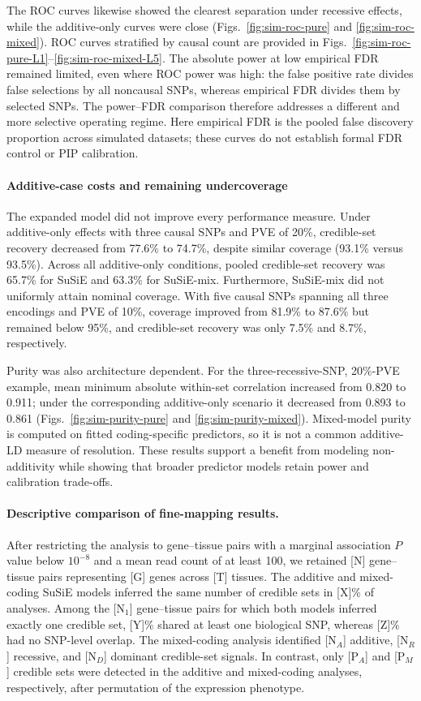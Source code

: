 \documentclass[12pt]{article}
\begin{document}
The ROC curves likewise showed the clearest separation under recessive
effects, while the additive-only curves were close
(Figs.~\ref{fig:sim-roc-pure} and \ref{fig:sim-roc-mixed}).
ROC curves stratified by causal count are provided in
Figs.~\ref{fig:sim-roc-pure-L1}--\ref{fig:sim-roc-mixed-L5}.
The absolute power at low empirical FDR remained limited, even where
ROC power was high: the false positive rate divides false selections
by all noncausal SNPs, whereas empirical FDR divides them by selected
SNPs. The power--FDR comparison therefore addresses a different and
more selective operating regime. Here empirical FDR is the pooled
false discovery proportion across simulated datasets; these curves
do not establish formal FDR control or PIP calibration.

\paragraph{Additive-case costs and remaining undercoverage}

The expanded model did not improve every performance measure. Under
additive-only effects with three causal SNPs and PVE of 20\%,
credible-set recovery decreased from 77.6\% to 74.7\%, despite similar
coverage (93.1\% versus 93.5\%). Across all additive-only conditions,
pooled credible-set recovery was 65.7\% for SuSiE and 63.3\% for
SuSiE-mix. Furthermore, SuSiE-mix did not uniformly attain nominal
coverage. With five causal SNPs spanning all three encodings and PVE
of 10\%, coverage improved from 81.9\% to 87.6\% but remained below
95\%, and credible-set recovery was only 7.5\% and 8.7\%, respectively.

Purity was also architecture dependent. For the three-recessive-SNP,
20\%-PVE example, mean minimum absolute within-set correlation increased
from 0.820 to 0.911; under the corresponding additive-only scenario it
decreased from 0.893 to 0.861 (Figs.~\ref{fig:sim-purity-pure} and
\ref{fig:sim-purity-mixed}). Mixed-model purity is computed on fitted
coding-specific predictors, so it is not a common additive-LD measure
of resolution. These results support a benefit from modeling
non-additivity while showing that broader predictor models retain
power and calibration trade-offs.


\paragraph{Descriptive comparison of fine-mapping results.}
After restricting the analysis to gene--tissue pairs with a marginal
association $P$ value below $10^{-8}$ and a mean read count of at
least 100, we retained [N] gene--tissue pairs representing [G] genes across
[T] tissues. The additive and mixed-coding SuSiE models inferred the same
number of credible sets in [X]\% of analyses. Among the [N$_1$] gene--tissue
pairs for which both models inferred exactly one credible set, [Y]\% shared
at least one biological SNP, whereas [Z]\% had no SNP-level overlap. The
mixed-coding analysis identified [N$_A$] additive, [N$_R$] recessive, and
[N$_D$] dominant credible-set signals. In contrast, only [P$_A$] and
[P$_M$] credible sets were detected in the additive and mixed-coding
analyses, respectively, after permutation of the expression phenotype.
\end{document}
